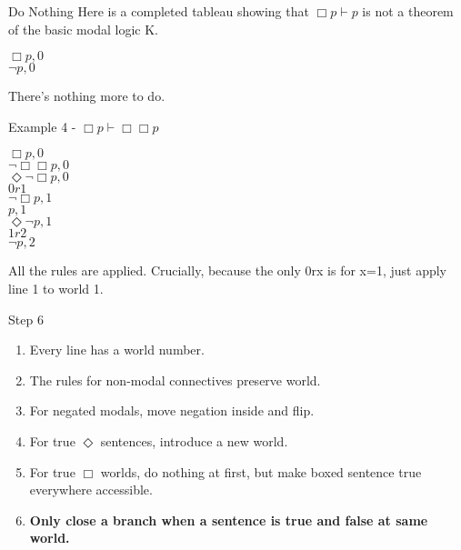 \documentclass[
  14pt,
  letterpaper,
  ignorenonframetext,
  aspectratio=169,
  handout]{beamer}
\providecommand{\tightlist}{%
  \setlength{\itemsep}{0pt}\setlength{\parskip}{0pt}}\usepackage{longtable,booktabs,array}
\begin{document}
\begin{frame}{Do Nothing}
\protect\hypertarget{do-nothing}{}
Here is a completed tableau showing that \(\Box p \vdash p\) is not a
theorem of the basic modal logic K.

\begin{center}
$\Box p, 0$ \\
$\neg p, 0$
\end{center}

There's nothing more to do.
\end{frame}

\begin{frame}{Example 4 - \(\Box p \vdash \Box \Box p\)}
\protect\hypertarget{example-4---box-p-vdash-box-box-p}{}
\begin{center}
$\Box p, 0$ \\
$\neg \Box \Box p, 0$ \\
$\Diamond \neg \Box p, 0$ \\
$0r1$ \\
$\neg \Box p, 1$ \\
$p, 1$ \\ 
$\Diamond \neg p, 1$ \\
$1r2$ \\
$\neg p, 2$
\end{center}

All the rules are applied. Crucially, because the only 0rx is for x=1,
just apply line 1 to world 1.
\end{frame}

\begin{frame}{Step 6}
\protect\hypertarget{step-6}{}
\begin{enumerate}
\tightlist
\item
  Every line has a world number.
\item
  The rules for non-modal connectives preserve world.
\item
  For negated modals, move negation inside and flip.
\item
  For true \(\Diamond\) sentences, introduce a new world.
\item
  For true \(\Box\) worlds, do nothing at first, but make boxed sentence
  true everywhere accessible.
\item
  \textbf{Only close a branch when a sentence is true and false at same
  world.}
\end{enumerate}
\end{frame}
\end{document}
